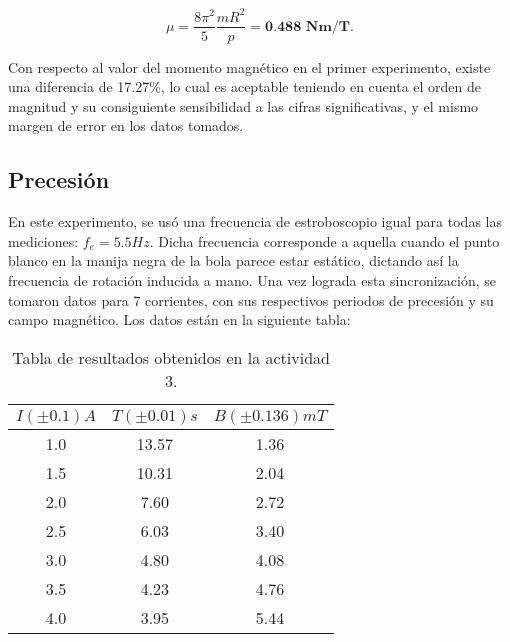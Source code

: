 \documentclass[%
 reprint,
 amsmath,amssymb,
 aps,
]{revtex4-1}
\begin{document}
\begin{equation*}
    \mu=\frac{8\pi^2}{5}\frac{mR^2}{p}=\textbf{0.488 Nm/T}.
\end{equation*}

Con respecto al valor del momento magnético en el primer experimento, existe una diferencia de 17.27\%, lo cual es aceptable teniendo en cuenta el orden de magnitud y su consiguiente sensibilidad a las cifras significativas, y el mismo margen de error en los datos tomados.

\subsection{Precesión}

En este experimento, se usó una frecuencia de estroboscopio igual para todas las mediciones: $f_e=5.5 Hz$. Dicha frecuencia corresponde a aquella cuando el punto blanco en la manija negra de la bola parece estar estático, dictando así la frecuencia de rotación inducida a mano. Una vez lograda esta sincronización, se tomaron datos para 7 corrientes, con sus respectivos periodos de precesión y su campo magnético. Los datos están en la siguiente tabla:

\begin{table}[H]
    \centering
    \begin{tabular}{|c|c|c|}
        \hline
        $I (\pm 0.1) A$ & $T (\pm 0.01) s$ & $B (\pm 0.136) mT$ \\ \hline
         1.0 & 13.57 & 1.36 \\ \hline
         1.5 & 10.31 & 2.04 \\ \hline
         2.0 & 7.60 & 2.72 \\ \hline
         2.5 & 6.03 & 3.40 \\ \hline
         3.0 & 4.80 & 4.08 \\ \hline
         3.5 & 4.23 & 4.76 \\ \hline
         4.0 & 3.95 & 5.44 \\ \hline
    \end{tabular}
    \caption{Tabla de resultados obtenidos en la actividad 3.}
    \label{tab: tabla3}
\end{table}
\end{document}
